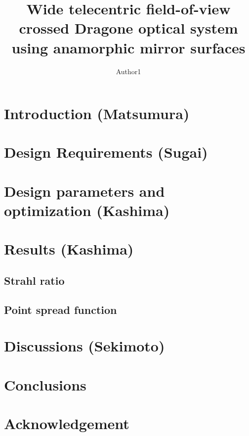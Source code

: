\documentclass[9pt,twocolumn,twoside]{osajnl}
\title{Wide telecentric field-of-view crossed Dragone optical system using anamorphic mirror surfaces}
\author[1]{Author1}
\affil[1]{Affiliation1, address1, Japan}
\affil[1]{Corresponding author: ***@***.jp}
\begin{document}
\maketitle
\thispagestyle{fancy}

\section{Introduction (Matsumura)}


\section{Design Requirements (Sugai)}

\section{Design parameters and optimization (Kashima)}


\section{Results (Kashima)}
\subsection{Strahl ratio}

\subsection{Point spread function}

\section{Discussions (Sekimoto)}


\section{Conclusions}


\begin{figure}[htbp] 
   \centering
   \caption{}
   \label{}
\end{figure}


\section*{Acknowledgement}


\end{document}

